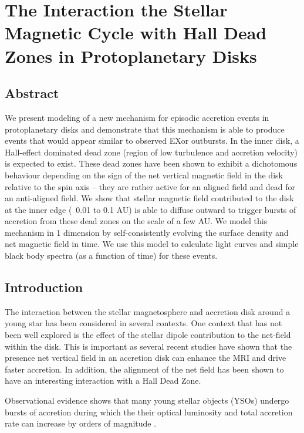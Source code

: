 \chapter{The Interaction the Stellar Magnetic Cycle with Hall Dead Zones in Protoplanetary Disks}
\label{hall}





\section{Abstract}
We present modeling of a new mechanism for episodic accretion events in protoplanetary disks and demonstrate that this mechanism is able to produce events that would appear similar to observed EXor outbursts.  In the inner disk, a Hall-effect dominated dead zone (region of low turbulence and accretion velocity) is expected to exist.  These dead zones have been shown to exhibit a dichotomous behaviour depending on the sign of the net vertical magnetic field in the disk relative to the spin axis -- they are rather active for an aligned field and dead for an anti-aligned field.  We show that stellar magnetic field contributed to the disk at the inner edge (~0.01 to 0.1 AU) is able to diffuse outward to trigger bursts of accretion from these dead zones on the scale of a few AU.  We model this mechanism in 1 dimension by self-consistently evolving the surface density and net magnetic field in time.  We use this model to calculate light curves and simple black body spectra (as a function of time) for these events. 




\newpage
\section{Introduction}
The interaction between the stellar magnetosphere and accretion disk around a young star has been considered in several contexts.  One context that has not been well explored is the effect of the stellar dipole contribution to the net-field within the disk.  This is important as several recent studies have shown that the presence net vertical field in an accretion disk can enhance the MRI and drive faster accretion.  In addition, the alignment of the net field has been shown to have an interesting interaction with a Hall Dead Zone.   

Observational evidence shows that many young stellar objects (YSOs) undergo bursts of accretion during which the their optical luminosity and total accretion rate can increase by orders of magnitude \citep{herbig77, hartmann96}.  

